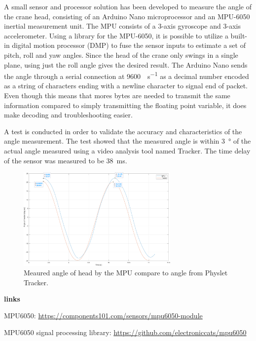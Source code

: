 

A small sensor and processor solution has been developed to measure the angle of the crane head, consisting of an Arduino Nano microprocessor and an MPU-6050 inertial measurement unit. The MPU consists of a 3-axis gyroscope and 3-axis accelerometer. Using a library for the MPU-6050, it is possible to utilize a built-in digital motion processor (DMP) to fuse the sensor inputs to estimate a set of pitch, roll and yaw angles. Since the head of the crane only swings in a single plane, using just the roll angle gives the desired result. The Arduino Nano sends the angle through a serial connection at \SI{9600}{\baud\per\second} as a decimal number encoded as a string of characters ending with a newline character to signal end of packet. Even though this means that mores bytes are needed to transmit the same information compared to simply transmitting the floating point variable, it does make decoding and troubleshooting easier.

A test is conducted in order to validate the accuracy and characteristics of the angle measurement. The test showed that the measured angle is within \SI{3}{\degree} of the actual angle measured using a video analysis tool named Tracker. The time delay of the sensor was measured to be \SI{38}{ms}.

\begin{figure}[H]
    \centering
    \includegraphics[width=0.7\textwidth]{pictures/angle_of_header.pdf}
    \caption{Meaured angle of head by the MPU compare to angle from Physlet Tracker. }
    \label{fig:res_angle_of_header}
\end{figure}


\textbf{links}

MPU6050:
\url{https://components101.com/sensors/mpu6050-module}

MPU6050 signal processing library:
\url{https://github.com/electroniccats/mpu6050}